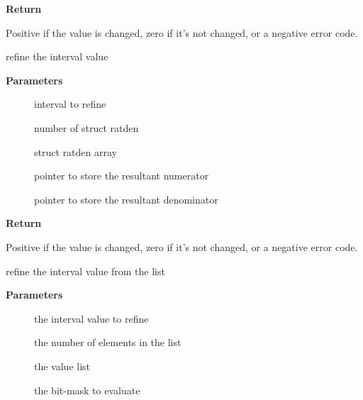 \documentclass[a4paper,8pt,english]{sphinxmanual}
\begin{document}
\textbf{Return}

Positive if the value is changed, zero if it's not changed, or a
negative error code.

\begin{fulllineitems}
\label{sound/kernel-api/alsa-driver-api:c.snd_interval_ratden}
refine the interval value

\end{fulllineitems}


\textbf{Parameters}
\begin{description}
\item[{}] \leavevmode
interval to refine

\item[{}] \leavevmode
number of struct ratden

\item[{}] \leavevmode
struct ratden array

\item[{}] \leavevmode
pointer to store the resultant numerator

\item[{}] \leavevmode
pointer to store the resultant denominator

\end{description}

\textbf{Return}

Positive if the value is changed, zero if it's not changed, or a
negative error code.

\begin{fulllineitems}
\label{sound/kernel-api/alsa-driver-api:c.snd_interval_list}
refine the interval value from the list

\end{fulllineitems}


\textbf{Parameters}
\begin{description}
\item[{}] \leavevmode
the interval value to refine

\item[{}] \leavevmode
the number of elements in the list

\item[{}] \leavevmode
the value list

\item[{}] \leavevmode
the bit-mask to evaluate

\end{description}
\end{document}
